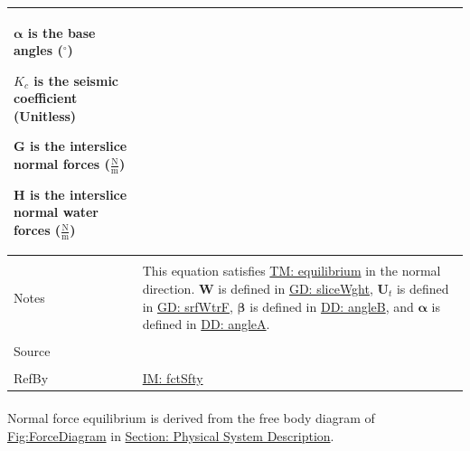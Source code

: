 \documentclass[12pt]{article}
\begin{document}
\begin{minipage}{\textwidth}
\begin{tabular}{>{\raggedright}p{}>{\raggedright\arraybackslash}p{}}
\begin{symbDescription}
                        \item{$\mathbf{α}$ is the base angles (${}^{\circ}$)}
                        \item{${K_{c}}$ is the seismic coefficient (Unitless)}
                        \item{$\mathbf{G}$ is the interslice normal forces ($\frac{\text{N}}{\text{m}}$)}
                        \item{$\mathbf{H}$ is the interslice normal water forces ($\frac{\text{N}}{\text{m}}$)}
                        \end{symbDescription}
          \\ \midrule \\
          Notes & This equation satisfies \hyperref[TM:equilibrium]{TM: equilibrium} in the normal direction. $\mathbf{W}$ is defined in \hyperref[GD:sliceWght]{GD: sliceWght}, ${\mathbf{U}_{t}}$ is defined in \hyperref[GD:srfWtrF]{GD: srfWtrF}, $\mathbf{β}$ is defined in \hyperref[DD:angleB]{DD: angleB}, and $\mathbf{α}$ is defined in \hyperref[DD:angleA]{DD: angleA}.
          \\ \midrule \\
          Source & \cite{chen2005}
          \\ \midrule \\
          RefBy & \hyperref[IM:fctSfty]{IM: fctSfty}
          \\ \bottomrule
          \end{tabular}
          \end{minipage}
\paragraph{}
\label{GD:normForcEqDeriv}
Normal force equilibrium is derived from the free body diagram of \hyperref[Figure:ForceDiagram]{Fig:ForceDiagram} in \hyperref[Sec:PhysSyst]{Section: Physical System Description}.
\par~
\end{document}
